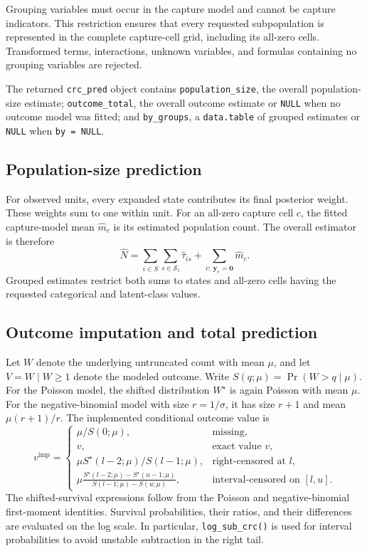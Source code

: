 \documentclass[11pt,letterpaper]{article}
\begin{document}
Grouping variables must occur in the capture model and cannot be capture
indicators. This restriction ensures that every requested subpopulation is
represented in the complete capture-cell grid, including its all-zero cells.
Transformed terms, interactions, unknown variables, and formulas containing no
grouping variables are rejected.

The returned \texttt{crc\_pred} object contains \texttt{population\_size}, the
overall population-size estimate; \texttt{outcome\_total}, the overall outcome
estimate or \texttt{NULL} when no outcome model was fitted; and
\texttt{by\_groups}, a \texttt{data.table} of grouped estimates or
\texttt{NULL} when \texttt{by = NULL}.

\subsection{Population-size prediction}

For observed units, every expanded state contributes its final posterior
weight. These weights sum to one within unit. For an all-zero capture cell
$c$, the fitted capture-model mean $\widehat m_c$ is its estimated population
count. The overall estimator is therefore
\[
  \widehat N
  =\sum_{i\in S}\sum_{s\in\mathcal S_i}\widehat\tau_{is}
   +\sum_{c:\,\boldsymbol y_c=\boldsymbol 0}\widehat m_c.
\]
Grouped estimates restrict both sums to states and all-zero cells having the
requested categorical and latent-class values.

\subsection{Outcome imputation and total prediction}

Let $W$ denote the underlying untruncated count with mean $\mu$, and let
$V=W\mid W\geq1$ denote the modeled outcome. Write
$S(q;\mu)=\Pr(W>q\mid\mu)$. For the Poisson model, the shifted distribution
$W^\star$ is again Poisson with mean $\mu$. For the negative-binomial model
with size $r=1/\sigma$, it has size $r+1$ and mean
$\mu(r+1)/r$. The implemented conditional outcome value is
\[
  v^{\mathrm{imp}}=
  \begin{cases}
    \mu/S(0;\mu), & \text{missing},\\
    v, & \text{exact value }v,\\
    \mu S^\star(l-2;\mu)/S(l-1;\mu),
      & \text{right-censored at }l,\\
    \displaystyle
    \mu\frac{S^\star(l-2;\mu)-S^\star(u-1;\mu)}
             {S(l-1;\mu)-S(u;\mu)},
      & \text{interval-censored on }[l,u].
  \end{cases}
\]
The shifted-survival expressions follow from the Poisson and
negative-binomial first-moment identities. Survival probabilities, their
ratios, and their differences are evaluated on the log scale. In particular,
\texttt{log\_sub\_crc()} is used for interval probabilities to avoid unstable
subtraction in the right tail.
\end{document}
